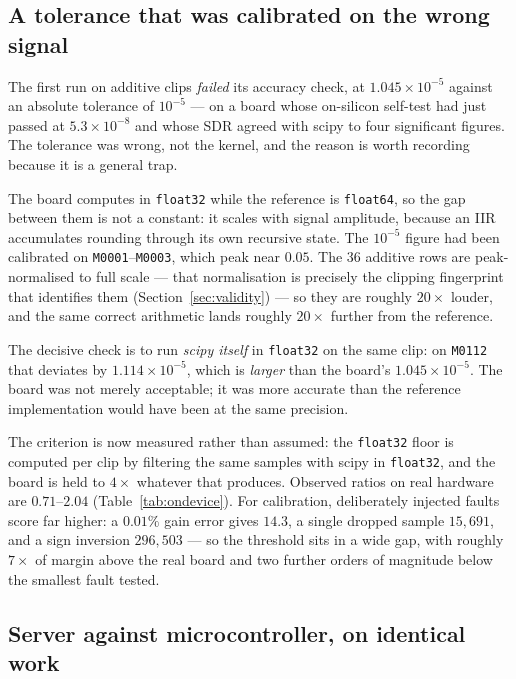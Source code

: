 \documentclass[11pt]{article}
\begin{document}
\subsection{A tolerance that was calibrated on the wrong signal}
\label{sec:firmware-tolerance}

The first run on additive clips \emph{failed} its accuracy check, at
$1.045\times10^{-5}$ against an absolute tolerance of $10^{-5}$ --- on a
board whose on-silicon self-test had just passed at $5.3\times10^{-8}$ and
whose SDR agreed with scipy to four significant figures. The tolerance was
wrong, not the kernel, and the reason is worth recording because it is a
general trap.

The board computes in \texttt{float32} while the reference is
\texttt{float64}, so the gap between them is not a constant: it scales with
signal amplitude, because an IIR accumulates rounding through its own
recursive state. The $10^{-5}$ figure had been calibrated on
\texttt{M0001}--\texttt{M0003}, which peak near $0.05$. The 36 additive rows
are peak-normalised to full scale --- that normalisation is precisely the
clipping fingerprint that identifies them (Section~\ref{sec:validity}) ---
so they are roughly $20\times$ louder, and the same correct arithmetic lands
roughly $20\times$ further from the reference.

The decisive check is to run \emph{scipy itself} in \texttt{float32} on the
same clip: on \texttt{M0112} that deviates by $1.114\times10^{-5}$, which is
\emph{larger} than the board's $1.045\times10^{-5}$. The board was not merely
acceptable; it was more accurate than the reference implementation would have
been at the same precision.

The criterion is now measured rather than assumed: the \texttt{float32} floor
is computed per clip by filtering the same samples with scipy in
\texttt{float32}, and the board is held to $4\times$ whatever that produces.
Observed ratios on real hardware are $0.71$--$2.04$ (Table~\ref{tab:ondevice}).
For calibration, deliberately injected faults score far higher: a
$0.01\%$ gain error gives $14.3$, a single dropped sample $15{,}691$, and a
sign inversion $296{,}503$ --- so the threshold sits in a wide gap, with
roughly $7\times$ of margin above the real board and two further orders of
magnitude below the smallest fault tested.

\subsection{Server against microcontroller, on identical work}
\label{sec:firmware-vs-server}
\end{document}
